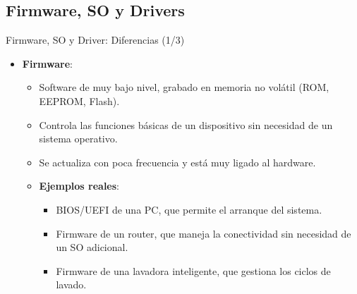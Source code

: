 \documentclass{beamer}
\begin{document}
\subsection{Firmware, SO y Drivers}
\begin{frame}{Firmware, SO y Driver: Diferencias (1/3)}
    \begin{itemize}
        \item \textbf{Firmware}:
            \begin{itemize}
                \item Software de muy bajo nivel, grabado en memoria no volátil (ROM, EEPROM, Flash).
                \item Controla las funciones básicas de un dispositivo sin necesidad de un sistema operativo.
                \item Se actualiza con poca frecuencia y está muy ligado al hardware.
                \item \textbf{Ejemplos reales}:
                    \begin{itemize}
                        \item BIOS/UEFI de una PC, que permite el arranque del sistema.
                        \item Firmware de un router, que maneja la conectividad sin necesidad de un SO adicional.
                        \item Firmware de una lavadora inteligente, que gestiona los ciclos de lavado.
                    \end{itemize}
            \end{itemize}
    \end{itemize}
\end{frame}
\end{document}
